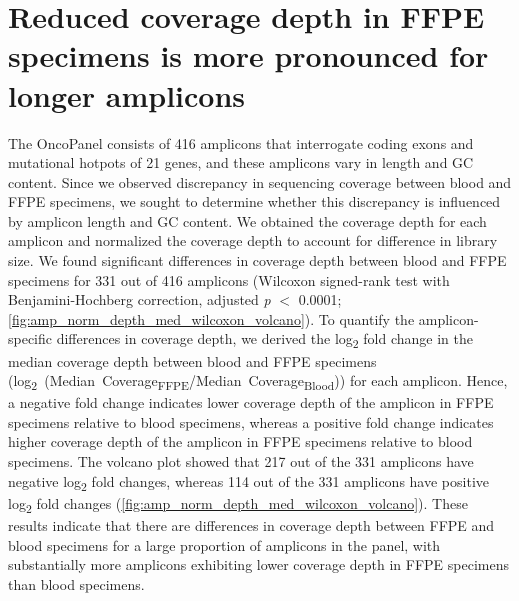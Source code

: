 \newpage
\section{Reduced coverage depth in FFPE specimens is more pronounced for longer amplicons}
\label{sec:ReducedcoveragedepthinFFPEspecimensismorepronouncedforlongeramplicons}

The OncoPanel consists of 416 amplicons that interrogate coding exons and mutational hotpots of 21 genes, and these amplicons vary in length and GC content. Since we observed discrepancy in sequencing coverage between blood and FFPE specimens, we sought to determine whether this discrepancy is influenced by amplicon length and GC content. We obtained the coverage depth for each amplicon and normalized the coverage depth to account for difference in library size. We found significant differences in coverage depth between blood and FFPE specimens for 331 out of 416 amplicons (Wilcoxon signed-rank test with Benjamini-Hochberg correction, adjusted \textit{p} $<$ 0.0001; \autoref{fig:amp_norm_depth_med_wilcoxon_volcano}). To quantify the amplicon-specific differences in coverage depth, we derived the log\textsubscript{2} fold change in the median coverage depth between blood and FFPE specimens \mbox{(log\textsubscript{2} (Median Coverage\textsubscript{FFPE}/Median Coverage\textsubscript{Blood}))} for each amplicon. Hence, a negative fold change indicates lower coverage depth of the amplicon in FFPE specimens relative to blood specimens, whereas a positive fold change indicates higher coverage depth of the amplicon in FFPE specimens relative to blood specimens. The volcano plot showed that 217 out of the 331 amplicons have negative log\textsubscript{2} fold changes, whereas 114 out of the 331 amplicons have positive log\textsubscript{2} fold changes (\autoref{fig:amp_norm_depth_med_wilcoxon_volcano}). These results indicate that there are differences in coverage depth between FFPE and blood specimens for a large proportion of amplicons in the panel, with substantially more amplicons exhibiting lower coverage depth in FFPE specimens than blood specimens.

